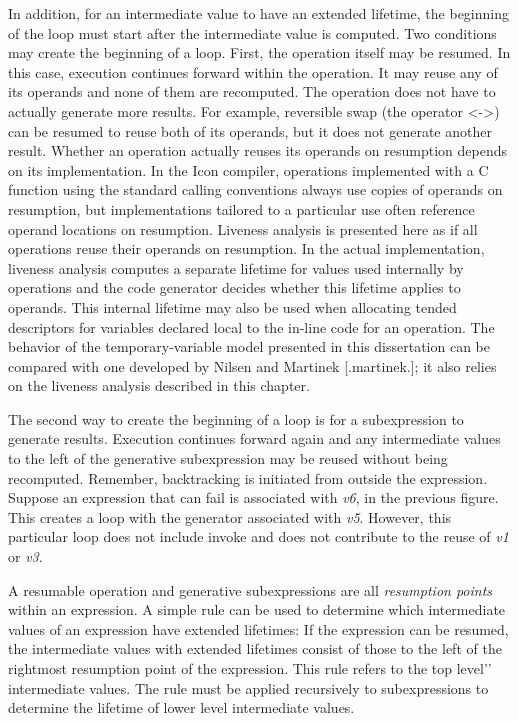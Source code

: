 In addition, for an intermediate value to have an extended lifetime,
the beginning of the loop must start after the intermediate value is
computed. Two conditions may create the beginning of a loop. First,
the operation itself may be resumed. In this case, execution continues
forward within the operation. It may reuse any of its operands and
none of them are recomputed. The operation does not have to actually
generate more results. For example, reversible swap (the operator
{\textless}-{\textgreater}) can be resumed to reuse both of its
operands, but it does not generate another result. Whether an
operation actually reuses its operands on resumption depends on its
implementation. In the Icon compiler, operations implemented with a C
function using the standard calling conventions always use copies of
operands on resumption, but implementations tailored to a particular
use often reference operand locations on resumption.  Liveness
analysis is presented here as if all operations reuse their operands
on resumption. In the actual implementation, liveness analysis
computes a separate lifetime for values used internally by operations
and the code generator decides whether this lifetime applies to
operands. This internal lifetime may also be used when allocating
tended descriptors for variables declared local to the in-line code
for an operation. The behavior of the temporary-variable model
presented in this dissertation can be compared with one developed by
Nilsen and Martinek [.martinek.]; it also relies on the liveness
analysis described in this chapter.

The second way to create the beginning of a loop is for a
subexpression to generate results. Execution continues forward again
and any intermediate values to the left of the generative
subexpression may be reused without being recomputed.  Remember,
backtracking is initiated from outside the expression. Suppose an
expression that can fail is associated with \textit{v6}, in the
previous figure. This creates a loop with the generator associated
with \textit{v5}. However, this particular loop does not include
invoke and does not contribute to the reuse of \textit{v1} or
\textit{v3}.

A resumable operation and generative subexpressions are all
\textit{resumption points} within an expression. A simple rule can be
used to determine which intermediate values of an expression have
extended lifetimes: If the expression can be resumed, the intermediate
values with extended lifetimes consist of those to the left of the
rightmost resumption point of the expression. This rule refers to the
{\textasciigrave}{\textasciigrave}top level'{}' intermediate values.
The rule must be applied recursively to subexpressions to determine
the lifetime of lower level intermediate values.

